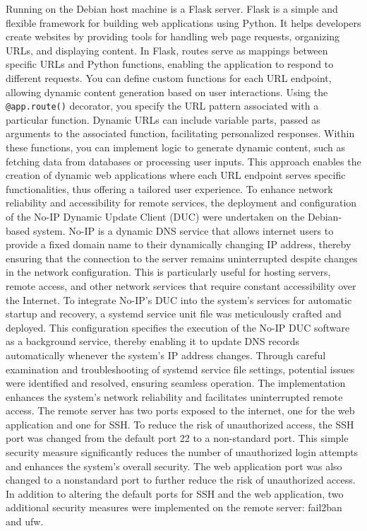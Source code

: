 \documentclass[12pt]{article} %
\begin{document}
\pagebreak
\noindent Running on the Debian host machine is a Flask server. Flask is a simple and flexible framework for building web applications using Python. It helps developers create websites by providing tools for handling web page requests, organizing URLs, and displaying content. In Flask, routes serve as mappings between specific URLs and Python functions, enabling the application to respond to different requests. You can define custom functions for each URL endpoint, allowing dynamic content generation based on user interactions. Using the \verb|@app.route()| decorator, you specify the URL pattern associated with a particular function. Dynamic URLs can include variable parts, passed as arguments to the associated function, facilitating personalized responses. Within these functions, you can implement logic to generate dynamic content, such as fetching data from databases or processing user inputs. This approach enables the creation of dynamic web applications where each URL endpoint serves specific functionalities, thus offering a tailored user experience.
\newline
\newline
\noindent To enhance network reliability and accessibility for remote services, the deployment and configuration of the No-IP Dynamic Update Client (DUC) were undertaken on the Debian-based system. No-IP is a dynamic DNS service that allows internet users to provide a fixed domain name to their dynamically changing IP address, thereby ensuring that the connection to the server remains uninterrupted despite changes in the network configuration. This is particularly useful for hosting servers, remote access, and other network services that require constant accessibility over the Internet. To integrate No-IP's DUC into the system's services for automatic startup and recovery, a systemd service unit file was meticulously crafted and deployed. This configuration specifies the execution of the No-IP DUC software as a background service, thereby enabling it to update DNS records automatically whenever the system's IP address changes. Through careful examination and troubleshooting of systemd service file settings, potential issues were identified and resolved, ensuring seamless operation. The implementation enhances the system's network reliability and facilitates uninterrupted remote access.
\newline
\newline
\noindent The remote server has two ports exposed to the internet, one for the web application and one for SSH. To reduce the risk of unauthorized access, the SSH port was changed from the default port 22 to a non-standard port. This simple security measure significantly reduces the number of unauthorized login attempts and enhances the system's overall security. The web application port was also changed to a nonstandard port to further reduce the risk of unauthorized access. In addition to altering the default ports for SSH and the web application, two additional security measures were implemented on the remote server: fail2ban and ufw.
\end{document}
